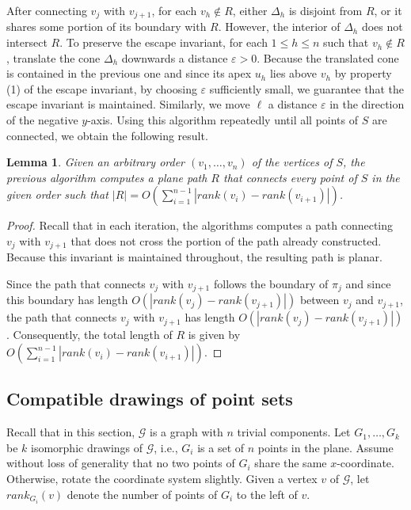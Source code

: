 \documentclass[a4paper, 11pt]{article}
\newtheorem{lemma}[theorem]{Lemma}
\begin{document}
After connecting $v_j$ with $v_{j+1}$, for each $v_h\notin R$, either $\Delta_h$ is disjoint from $R$, or it shares some portion of its boundary with $R$. However, the interior of $\Delta_h$ does not intersect $R$.
To preserve the escape invariant, for each $1\leq h\leq n$ such that $v_h\notin R$, translate the cone $\Delta_h$ downwards a distance $\varepsilon>0$. Because the translated cone is contained in the previous one and since its apex $u_h$ lies above $v_h$ by property (1) of the escape invariant, by choosing $\varepsilon$ sufficiently small, we guarantee that the escape invariant is maintained. Similarly, we move $\ell$ a distance $\varepsilon$ in the direction of the negative $y$-axis. Using this algorithm repeatedly until all points of $S$ are connected, we obtain the following result.

\begin{lemma}\label{lemma:Compatible augmentation for trivial components}
Given an arbitrary order $(v_1, \ldots, v_n)$ of the vertices of $S$, the previous algorithm computes a plane path $R$ that connects every point of $S$ in the given order such that 
$|R| = O\left(\sum_{i=1}^{n-1} |rank(v_i) - rank(v_{i+1})| \right)$. 
\end{lemma}
\begin{proof}
Recall that in each iteration, the algorithms computes a path connecting $v_j$ with $v_{j+1}$ that does not cross the portion of the path already constructed. Because this invariant is maintained throughout, the resulting path is planar.

Since the path that connects $v_j$ with $v_{j+1}$ follows the boundary of $\pi_j$ and since this boundary has length $O(|rank(v_j) - rank(v_{j+1})|)$ between $v_j$ and $v_{j+1}$, the path that connects $v_j$ with $v_{j+1}$ has length $O(|rank(v_j) - rank(v_{j+1})|)$. Consequently,  the total length of $R$ is given by $O\left(\sum_{i=1}^{n-1} |rank(v_i) - rank(v_{i+1}) |\right)$.
\end{proof}



\subsection{Compatible drawings of point sets}
Recall that in this section, $\mathcal G$ is a graph with $n$ trivial components.
Let $G_1, \ldots, G_k$ be $k$ isomorphic drawings of $\mathcal G$, i.e., $G_i$ is a set of $n$ points in the plane.
Assume without loss of generality that no two points of $G_i$ share the same $x$-coordinate. Otherwise, rotate the coordinate system slightly.
Given a vertex $v$ of $\mathcal G$, let $rank_{G_i}(v)$ denote the number of points of $G_i$ to the left of $v$.
\end{document}
